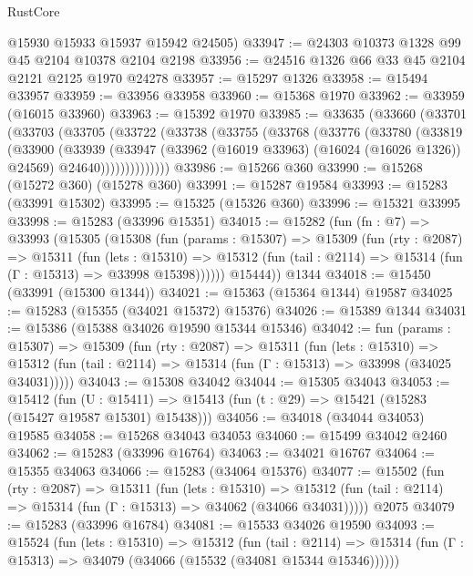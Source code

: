 \begin{lexlean}{RustCore}
\begin{coremodule}
      @15930
      @15933
      @15937
      @15942
      @24505)
@33947 := @24303 @10373 @1328 @99 @45 @2104 @10378 @2104 @2198
@33956 := @24516 @1326 @66 @33 @45 @2104 @2121 @2125 @1970 @24278
@33957 := @15297 @1326
@33958 := @15494 @33957
@33959 := @33956 @33958
@33960 := @15368 @1970
@33962 := @33959 (@16015 @33960)
@33963 := @15392 @1970
@33985 := @33635
    (@33660
      (@33701
        (@33703
          (@33705
            (@33722
              (@33738
                (@33755
                  (@33768
                    (@33776
                      (@33780
                        (@33819
                          (@33900
                            (@33939
                              (@33947
                                (@33962 (@16019 @33963) (@16024 (@16026 @1326)) @24569)
                                @24640))))))))))))))
@33986 := @15266 @360
@33990 := @15268 (@15272 @360) (@15278 @360)
@33991 := @15287 @19584
@33993 := @15283 (@33991 @15302)
@33995 := @15325 (@15326 @360)
@33996 := @15321 @33995
@33998 := @15283 (@33996 @15351)
@34015 := @15282
    (fun (fn : @7) =>
    @33993
      (@15305
        (@15308
          (fun (params : @15307) =>
          @15309
            (fun (rty : @2087) =>
            @15311
              (fun (lets : @15310) =>
              @15312 (fun (tail : @2114) => @15314 (fun (Γ : @15313) => @33998 @15398))))))
        @15444))
    @1344
@34018 := @15450 (@33991 (@15300 @1344))
@34021 := @15363 (@15364 @1344) @19587
@34025 := @15283 (@15355 (@34021 @15372) @15376)
@34026 := @15389 @1344
@34031 := @15386 (@15388 @34026 @19590 @15344 @15346)
@34042 := fun (params : @15307) =>
  @15309
    (fun (rty : @2087) =>
    @15311
      (fun (lets : @15310) =>
      @15312 (fun (tail : @2114) => @15314 (fun (Γ : @15313) => @33998 (@34025 @34031)))))
@34043 := @15308 @34042
@34044 := @15305 @34043
@34053 := @15412
    (fun (U : @15411) => @15413 (fun (t : @29) => @15421 (@15283 (@15427 @19587 @15301) @15438)))
@34056 := @34018 (@34044 @34053) @19585
@34058 := @15268 @34043 @34053
@34060 := @15499 @34042 @2460
@34062 := @15283 (@33996 @16764)
@34063 := @34021 @16767
@34064 := @15355 @34063
@34066 := @15283 (@34064 @15376)
@34077 := @15502
    (fun (rty : @2087) =>
    @15311
      (fun (lets : @15310) =>
      @15312 (fun (tail : @2114) => @15314 (fun (Γ : @15313) => @34062 (@34066 @34031)))))
    @2075
@34079 := @15283 (@33996 @16784)
@34081 := @15533 @34026 @19590
@34093 := @15524
    (fun (lets : @15310) =>
    @15312
      (fun (tail : @2114) =>
      @15314 (fun (Γ : @15313) => @34079 (@34066 (@15532 (@34081 @15344 @15346))))))

\end{coremodule}
\end{lexlean}
